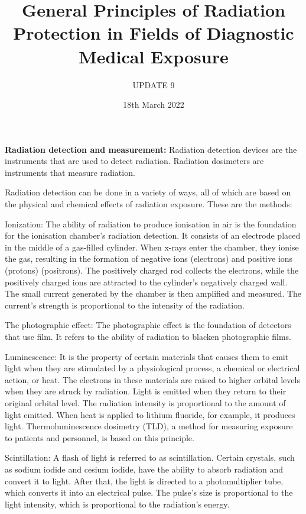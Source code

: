 \documentclass[12pt]{article}
\title{General Principles of Radiation Protection in Fields of Diagnostic Medical Exposure}
\author{UPDATE 9}
\date{18th March 2022}
\begin{document}
\maketitle

\textbf{Radiation detection and measurement:}
Radiation detection devices are the instruments that are used to detect radiation. Radiation dosimeters are instruments that measure radiation.

\raggedright Radiation detection can be done in a variety of ways, all of which are based on the physical and chemical effects of radiation exposure. These are the methods:

Ionization: The ability of radiation to produce ionisation in air is the foundation for the ionisation chamber's radiation detection. It consists of an electrode placed in the middle of a gas-filled cylinder. When x-rays enter the chamber, they ionise the gas, resulting in the formation of negative ions (electrons) and positive ions (protons) (positrons). The positively charged rod collects the electrons, while the positively charged ions are attracted to the cylinder's negatively charged wall. The small current generated by the chamber is then amplified and measured. The current's strength is proportional to the intensity of the radiation.

The photographic effect: The photographic effect is the foundation of detectors that use film. It refers to the ability of radiation to blacken photographic films.

Luminescence: It is the property of certain materials that causes them to emit light when they are stimulated by a physiological process, a chemical or electrical action, or heat. The electrons in these materials are raised to higher orbital levels when they are struck by radiation. Light is emitted when they return to their original orbital level. The radiation intensity is proportional to the amount of light emitted. When heat is applied to lithium fluoride, for example, it produces light. Thermoluminescence dosimetry (TLD), a method for measuring exposure to patients and personnel, is based on this principle.

Scintillation: A flash of light is referred to as scintillation. Certain crystals, such as sodium iodide and cesium iodide, have the ability to absorb radiation and convert it to light. After that, the light is directed to a photomultiplier tube, which converts it into an electrical pulse. The pulse's size is proportional to the light intensity, which is proportional to the radiation's energy.
\end{document}

